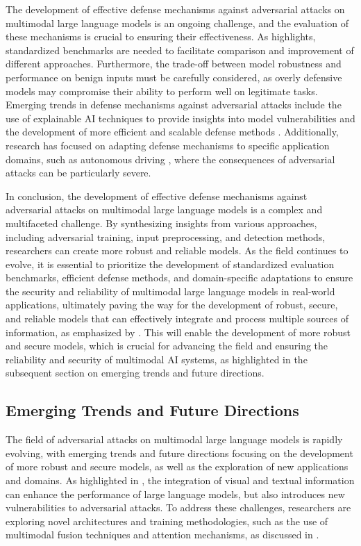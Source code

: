 \documentclass[11pt,a4paper]{article}
\begin{document}
The development of effective defense mechanisms against adversarial attacks on multimodal large language models is an ongoing challenge, and the evaluation of these mechanisms is crucial to ensuring their effectiveness. As \cite{arxiv:2409.18142} highlights, standardized benchmarks are needed to facilitate comparison and improvement of different approaches. Furthermore, the trade-off between model robustness and performance on benign inputs must be carefully considered, as overly defensive models may compromise their ability to perform well on legitimate tasks. Emerging trends in defense mechanisms against adversarial attacks include the use of explainable AI techniques to provide insights into model vulnerabilities \cite{arxiv:2412.02104} and the development of more efficient and scalable defense methods \cite{arxiv:2409.18991}. Additionally, research has focused on adapting defense mechanisms to specific application domains, such as autonomous driving \cite{doi:10.1109/wacvw60836.2024.00106}, where the consequences of adversarial attacks can be particularly severe.

In conclusion, the development of effective defense mechanisms against adversarial attacks on multimodal large language models is a complex and multifaceted challenge. By synthesizing insights from various approaches, including adversarial training, input preprocessing, and detection methods, researchers can create more robust and reliable models. As the field continues to evolve, it is essential to prioritize the development of standardized evaluation benchmarks, efficient defense methods, and domain-specific adaptations to ensure the security and reliability of multimodal large language models in real-world applications, ultimately paving the way for the development of robust, secure, and reliable models that can effectively integrate and process multiple sources of information, as emphasized by \cite{arxiv:2401.13601}. This will enable the development of more robust and secure models, which is crucial for advancing the field and ensuring the reliability and security of multimodal AI systems, as highlighted in the subsequent section on emerging trends and future directions.


\subsection{Emerging Trends and Future Directions}


The field of adversarial attacks on multimodal large language models is rapidly evolving, with emerging trends and future directions focusing on the development of more robust and secure models, as well as the exploration of new applications and domains. As highlighted in \cite{arxiv:1411.2539}, the integration of visual and textual information can enhance the performance of large language models, but also introduces new vulnerabilities to adversarial attacks. To address these challenges, researchers are exploring novel architectures and training methodologies, such as the use of multimodal fusion techniques and attention mechanisms, as discussed in \cite{arxiv:2407.15272}.
\end{document}
